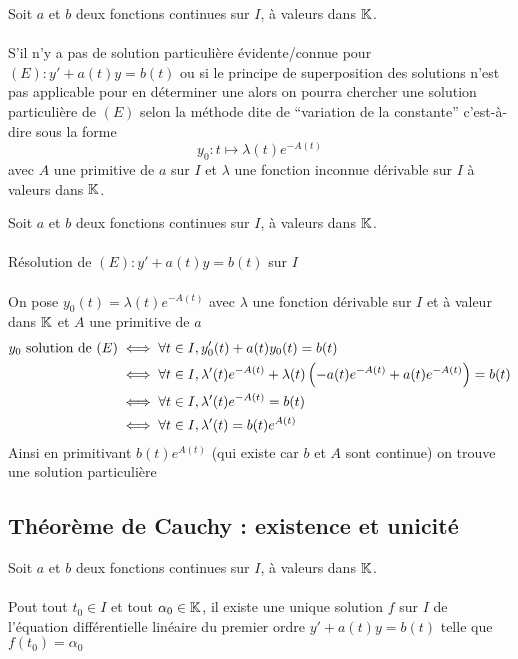 \begin{defprop}

    Soit \(a\) et \(b\) deux fonctions continues sur \(I\), à valeurs dans \(\mathbb{K}\).\\~\\
    S’il n’y a pas de solution particulière évidente/connue pour \((E) : y' + a(t)y = b(t)\) ou si le principe de superposition des solutions n’est pas applicable pour en déterminer une alors on pourra chercher une solution particulière de \((E)\) selon la méthode dite de “variation de la constante” c’est-à-dire sous la forme
    \[y_0 : t \mapsto \lambda(t)e^{-A(t)}\]
    avec \(A\) une primitive de \(a\) sur \(I\) et \(\lambda\) une fonction inconnue dérivable sur \(I\) à valeurs dans \(\mathbb{K}\).
\end{defprop}

\begin{dem}
    Soit \(a\) et \(b\) deux fonctions continues sur \(I\), à valeurs dans \(\mathbb{K}\).\\~\\
    Résolution de \((E) : y' + a(t)y = b(t)\) sur \(I\)\\~\\
    On pose \(y_0(t) = \lambda(t)e^{-A(t)}\) avec \(\lambda\) une fonction dérivable sur \(I\) et à valeur dans \(\mathbb{K}\) et \(A\) une primitive de \(a\)
    \begin{align*}
        y_0 \text{ solution de } (E) &\iff \forall t \in I,y_0'(t) + a(t)y_0(t) = b(t) \\
        &\iff \forall t \in I,\lambda'(t)e^{-A(t)} + \lambda(t)\left(-a(t)e^{-A(t)} + a(t)e^{-A(t)}\right) = b(t) \\
        &\iff \forall t \in I,\lambda'(t)e^{-A(t)} = b(t) \\
        &\iff \forall t \in I, \lambda'(t) = b(t)e^{A(t)}
    \end{align*}
    Ainsi en primitivant \(b(t)e^{A(t)}\) (qui existe car \(b\) et \(A\) sont continue) on trouve une solution particulière
\end{dem}

\subsection{Théorème de Cauchy : existence et unicité}
\begin{theo}
    Soit \(a\) et \(b\) deux fonctions continues sur \(I\), à valeurs dans \(\mathbb{K}\).\\~\\
    Pout tout \(t_0 \in I\) et tout \(\alpha_0 \in \mathbb{K} \), il existe une unique solution \(f\) sur \(I\) de l’équation différentielle linéaire du premier ordre \(y' + a(t)y = b(t)\) telle que \(f(t_0) = \alpha_0\)
\end{theo}

